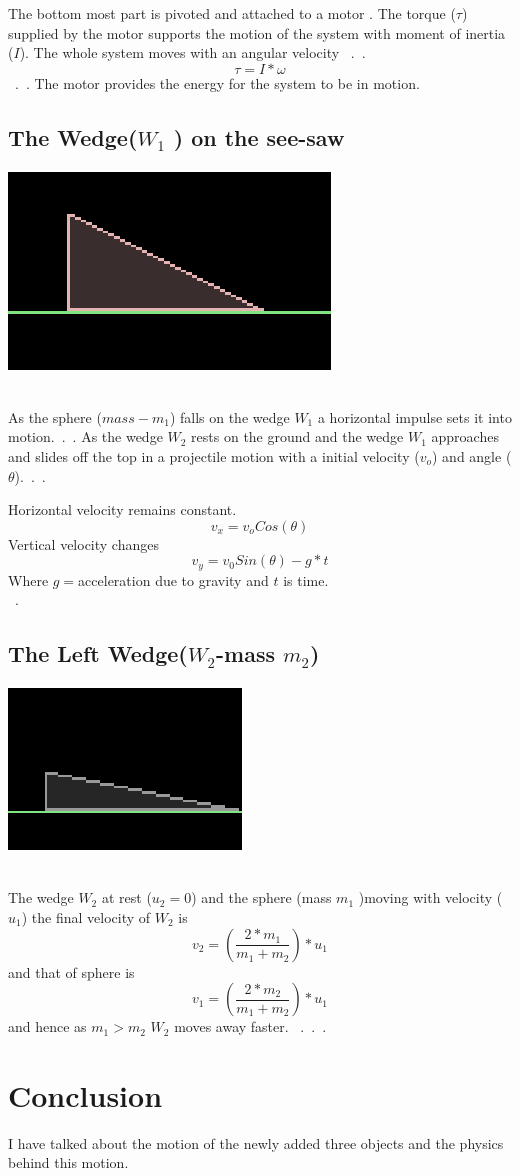 \documentclass [11pt]{article}
\begin{document}
The bottom most part is pivoted and attached to a motor . The torque ($\tau$) supplied by the motor 
supports the motion of the system with moment of inertia ($I$). The whole system moves with an angular velocity ~\cite{hal11}.~\cite{hc11}.
\[ \tau = I* \omega \] ~\cite{tor11}.~\cite{mi11}.
The motor provides the energy for the system to be in motion.

\subsection{The Wedge($W_1$ ) on the see-saw }
\includegraphics [scale=0.7]{w1}\\\

As the sphere ($mass - m_1$) falls on the wedge $W_1$ a horizontal impulse sets it into motion.~\cite{im11}.~\cite{coll11}.
As the wedge $W_2$ rests on the ground and the wedge $W_1$ approaches and slides off the top
in a projectile motion with a initial velocity ($v_o$) and angle ($\theta$).~\cite{hal11}.~\cite{hc11}.

Horizontal velocity remains constant.
\[v_x =  v_o Cos (\theta ) \]
Vertical velocity changes \[v_y = v_0 Sin(\theta) - g*t \]
Where $g= $acceleration due to gravity and $t$ is time.\\ ~\cite{pro11}.

\subsection{The Left Wedge($W_2$-mass $m_2$)}
\includegraphics [scale=0.7]{w2}\\\

The wedge $W_2$ at rest ($u_2 = 0$) and the sphere (mass $m_1$ )moving with velocity ($u_1$) the final velocity of 
$W_2$ is 
\[v_2 = (\frac{2*m_1}{m_1+m_2 })*u_1\]
and that of sphere is 
\[v_1 = (\frac{2*m_2}{m_1+m_2 })*u_1\] 
and hence as $m_1 > m_2$ $W_2$ moves away faster. ~\cite{hal11}.~\cite{hc11}.~\cite{coll11}.

\section {Conclusion}
I have talked about the motion of the newly added three objects and the physics behind this motion.


\end{document}
